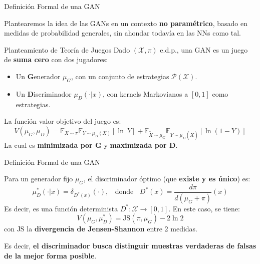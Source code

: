 \documentclass[aspectratio=169,xcolor=dvipsnames, t, spanish]{beamer}
\begin{document}
\begin{frame}{Definición Formal de una GAN}\vspace{-3mm}
    \begin{center}
        Plantearemos la idea de las GANs en un contexto \textbf{no paramétrico}, basado en medidas de probabilidad generales, sin ahondar todavía en las NNs como tal.
    \end{center}
    \pause
    \begin{block}{Planteamiento de Teoría de Juegos}
    Dado $(\mathcal{X}, \pi)$ e.d.p., una GAN es un juego de \textbf{suma cero} con dos jugadores:
            \begin{itemize}
                \item Un \textbf{G}enerador $\mu_{G}$, con un conjunto de estrategias $\mathcal{P}(\mathcal{X})$.
                \item Un \textbf{D}iscriminador $\mu_{D}(\cdot|x)$, con kernels Markovianos a $[0,1]$ como estrategias.
            \end{itemize}
    La función valor objetivo del juego es:   
    $$V(\mu_{G},\mu_{D})=\mathbb{E}_{X\sim\pi}\mathbb{E}_{Y\sim\mu_{D}(X)}[\ln~Y]+\mathbb{E}_{\tilde{X}\sim\mu_{G}}\mathbb{E}_{Y\sim\mu_{D}(\tilde{X})}[\ln(1-Y)]$$ 
    La cual es \textbf{minimizada por G} y \textbf{maximizada por D}. 
    \end{block}
\end{frame}

\begin{frame}{Definición Formal de una GAN}

\begin{theorem}
Para un generador fijo $\mu_G$, el discriminador óptimo (que \textbf{existe y es único}) es:
\[
\mu_D^*(\cdot|x) = \delta_{D^*(x)}(\cdot),\;\; \text{ donde } \;\; D^*(x) = \frac{d\pi}{d(\mu_G + \pi)}(x)
\]
Es decir, es una función determinista $D^*:\mathcal{X} \to [0,1]$. En este caso, se tiene:
\[
V(\mu_G, \mu_D^*) = \text{JS}(\pi, \mu_G) - 2\ln 2
\]
con $\text{JS}$ la \textbf{divergencia de Jensen-Shannon} entre 2 medidas.
\end{theorem}
\pause
\begin{center}
    Es decir, \textbf{el discriminador busca distinguir muestras verdaderas de falsas de la mejor forma posible}.
\end{center}
\end{frame}
\end{document}
